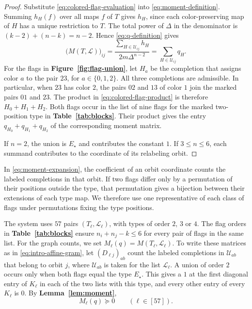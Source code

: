 \begin{proof}
Substitute \eqref{eq:colored-flag-evaluation} into
\eqref{eq:moment-definition}. Summing $h_H(f)$ over all maps
$f$ of $T$ gives $h_H$, since each color-preserving map of $H$
has a unique restriction to $T$. The total power of $\Delta$ in
the denominator is $(k-2)+(n-k)=n-2$. Hence
\eqref{eq:q-definition} gives
\begin{equation}\label{eq:moment-expansion}
 \bigl(M(T,\mathcal L)\bigr)_{ij}
 =\frac{\displaystyle\sum_{H\in\mathcal U_{ij}}h_H}{2m\Delta^{n-2}}
 =\sum_{H\in\mathcal U_{ij}}q_H.
\end{equation}
For the flags in \textbf{Figure~\ref{fig:flag-union}}, let $H_a$ be
the completion that assigns color $a$ to the pair $23$, for
$a\in\{0,1,2\}$. All three completions are admissible. In particular,
when $23$ has color $2$, the pairs $02$ and $13$ of color $1$ join
the marked pairs $01$ and $23$. The product in
\eqref{eq:colored-flag-product} is therefore $H_0+H_1+H_2$.
Both flags occur in the list of nine flags for the marked
two-position type in \textbf{Table~\ref{tab:blocks}}. Their product
gives the entry $q_{H_0}+q_{H_1}+q_{H_2}$ of the corresponding
moment matrix.

If $n=2$, the union is $E_\star$ and contributes the constant $1$.
If $3\leq n\leq6$, each summand contributes to the coordinate of
its relabeling orbit.
\end{proof}

In \eqref{eq:moment-expansion}, the coefficient of an orbit coordinate
counts the labeled completions in that orbit. If two flags differ
only by a permutation of their positions outside the type, that
permutation gives a bijection between their extensions of each
type map. We therefore use one representative of each class of
flags under permutations fixing the type positions.

The system uses $57$ pairs $(T_\ell,\mathcal L_\ell)$, with types of
order $2$, $3$ or $4$. The flag orders in
\textbf{Table~\ref{tab:blocks}} ensure $n_i+n_j-k\leq6$ for every
pair of flags in the same list. For the graph counts, we set
$M_\ell(q)=M(T_\ell,\mathcal L_\ell)$. To write these matrices as in
\eqref{eq:intro-affine-gram}, let $(D_{\ell j})_{ab}$ count the labeled
completions in $\mathcal U_{ab}$ that belong to orbit $j$, where
$\mathcal U_{ab}$ is taken for the list $\mathcal L_\ell$.
A union of order $2$ occurs only when both flags equal the type
$E_\star$. This gives a $1$ at the first diagonal entry of $K_\ell$
in each of the two lists with this type, and every other entry of
every $K_\ell$ is $0$. By \textbf{Lemma~\ref{lem:moment}},
\begin{equation}\label{eq:positive-moments}
 M_\ell(q)\succeq0\qquad(\ell\in[57]).
\end{equation}


